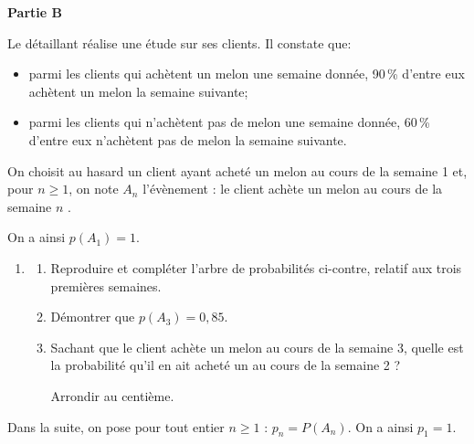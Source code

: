 \documentclass[10pt,a4paper]{article}
\begin{document}
\bigskip

\textbf{Partie B}

\medskip

Le détaillant réalise une étude sur ses clients. Il constate que:

\begin{itemize}
\item parmi les clients qui achètent un melon une semaine donnée, 90\,\% d'entre eux achètent un
melon la semaine suivante;
\item parmi les clients qui n'achètent pas de melon une semaine donnée, 60\,\% d'entre eux n'achè\-tent
pas de melon la semaine suivante.
\end{itemize}

\smallskip

On choisit au hasard un client ayant acheté un melon au cours de la semaine 1 et, pour $n \geqslant 1$, on
note $A_n$ l'évènement : \og le client achète un melon au cours de la semaine $n$ \fg.

On a ainsi $p\left(A_1\right) = 1$.

\medskip

\parbox{0.6\linewidth}{\begin{enumerate}
\item 
	\begin{enumerate}
		\item Reproduire et compléter l'arbre de probabilités
ci-contre, relatif aux trois premières semaines.
		\item Démontrer que $p\left(A_3\right) = 0,85$.
		\item Sachant que le client achète un melon au cours
de la semaine 3, quelle est la probabilité qu'il en ait acheté un au cours de la semaine 2 ?
		
Arrondir au centième.
	\end{enumerate}
\end{enumerate}
}\hfill 
\parbox{0.31\linewidth}{
{
      {
      }

     {
     }
}
}
\medskip
	
Dans la suite, on pose pour tout entier $n \geqslant 1$ : \:$p_n = P\left(A_n\right)$. On a ainsi $p_1 = 1$.

\medskip
\end{document}
